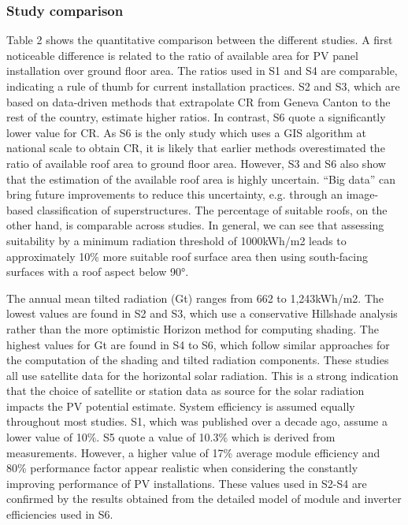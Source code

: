 \subsubsection{Study comparison}
Table 2 shows the quantitative comparison between the different studies. A first noticeable difference is related to the ratio of available area for PV panel installation over ground floor area. The ratios used in S1 and S4 are comparable, indicating a rule of thumb for current installation practices. S2 and S3, which are based on data-driven methods that extrapolate CR from Geneva Canton to the rest of the country, estimate higher ratios. In contrast, S6 quote a significantly lower value for CR. As S6 is the only study which uses a GIS algorithm at national scale to obtain CR, it is likely that earlier methods overestimated the ratio of available roof area to ground floor area. However, S3 and S6 also show that the estimation of the available roof area is highly uncertain. “Big data” can bring future improvements to reduce this uncertainty, e.g. through an image-based classification of superstructures. The percentage of suitable roofs, on the other hand, is comparable across studies. In general, we can see that assessing suitability by a minimum radiation threshold of 1000kWh/m2 leads to approximately 10\% more suitable roof surface area then using south-facing surfaces with a roof aspect below 90°. 

The annual mean tilted radiation (Gt) ranges from 662 to 1,243kWh/m2. The lowest values are found in S2 and S3, which use a conservative Hillshade analysis rather than the more optimistic Horizon method for computing shading. The highest values for Gt are found in S4 to S6, which follow similar approaches for the computation of the shading and tilted radiation components. These studies all use satellite data for the horizontal solar radiation. This is a strong indication that the choice of satellite or station data as source for the solar radiation impacts the PV potential estimate. System efficiency is assumed equally throughout most studies. S1, which was published over a decade ago, assume a lower value of 10\%. S5 quote a value of 10.3\% which is derived from measurements. However, a higher value of 17\% average module efficiency and 80\% performance factor appear realistic when considering the constantly improving performance of PV installations. These values used in S2-S4 are confirmed by the results obtained from the detailed model of module and inverter efficiencies used in S6.

